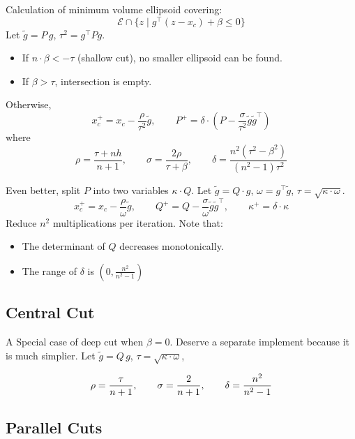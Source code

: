 \documentclass[final,leqno]{siamltex}
\providecommand{\tightlist}{%
  \setlength{\itemsep}{0pt}\setlength{\parskip}{0pt}}
\begin{document}
Calculation of minimum volume ellipsoid covering:
\[\mathcal{E} \cap \{z \mid g^\top (z - x_c) + \beta \leq 0 \}
\]
Let \(\tilde{g} = P\,g\), \(\tau^2 = g^\top P g\).

\begin{itemize}
\tightlist
\item
  If \(n \cdot \beta < -\tau\) (shallow cut), no smaller ellipsoid can be found.
\item
  If \(\beta > \tau\), intersection is empty.
\end{itemize}

Otherwise,
\[x_c^+ = x_c - \frac{\rho}{ \tau^2 } \tilde{g}, \qquad
  P^+ = \delta\cdot\left(P - \frac{\sigma}{ \tau^2 } \tilde{g}\tilde{g}^\top\right)
\]
where
\[\rho = \frac{ \tau+nh}{n+1}, \qquad
  \sigma = \frac{2\rho}{ \tau+\beta}, \qquad
  \delta = \frac{n^2(\tau^2 - \beta^2)}{(n^2 - 1)\tau^2}
\]

Even better, split \(P\) into two variables \(\kappa \cdot Q\).
Let \(\tilde{g} = Q \cdot g\), \(\omega = g^\top\tilde{g}\), \(\tau = \sqrt{\kappa\cdot\omega}\).
\[x_c^+ = x_c - \frac{\rho}{\omega} \tilde{g}, \qquad
  Q^+ = Q - \frac{\sigma}{\omega} \tilde{g}\tilde{g}^\top, \qquad
  \kappa^+ =  \delta\cdot\kappa
\]
Reduce \(n^2\) multiplications per iteration.
Note that:

\begin{itemize}
\tightlist
\item
  The determinant of \(Q\) decreases monotonically.
\item
  The range of \(\delta\) is \((0, \frac{n^2}{n^2 - 1})\)
\end{itemize}

\hypertarget{sec:central-cut}{%
\subsection{Central Cut}\label{sec:central-cut}}

A Special case of deep cut when \(\beta = 0\).
Deserve a separate implement because it is much simplier.
Let \(\tilde{g} = Q\,g\), \(\tau = \sqrt{\kappa\cdot\omega}\),

\[\rho = {\tau \over n+1}, \qquad
  \sigma = {2 \over n+1}, \qquad
  \delta = {n^2 \over n^2 - 1}
\]

\hypertarget{sec:parallel-cuts}{%
\subsection{Parallel Cuts}\label{sec:parallel-cuts}}
\end{document}

